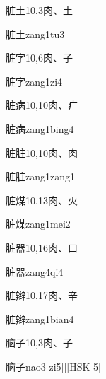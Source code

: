 \begin{entry}{脏土}{10,3}{⾁、⼟}
  \begin{phonetics}{脏土}{zang1tu3}
  \end{phonetics}
\end{entry}

\begin{entry}{脏字}{10,6}{⾁、⼦}
  \begin{phonetics}{脏字}{zang1zi4}
  \end{phonetics}
\end{entry}

\begin{entry}{脏病}{10,10}{⾁、⽧}
  \begin{phonetics}{脏病}{zang1bing4}
  \end{phonetics}
\end{entry}

\begin{entry}{脏脏}{10,10}{⾁、⾁}
  \begin{phonetics}{脏脏}{zang1zang1}
  \end{phonetics}
\end{entry}

\begin{entry}{脏煤}{10,13}{⾁、⽕}
  \begin{phonetics}{脏煤}{zang1mei2}
  \end{phonetics}
\end{entry}

\begin{entry}{脏器}{10,16}{⾁、⼝}
  \begin{phonetics}{脏器}{zang4qi4}
  \end{phonetics}
\end{entry}

\begin{entry}{脏辫}{10,17}{⾁、⾟}
  \begin{phonetics}{脏辫}{zang1bian4}
  \end{phonetics}
\end{entry}

\begin{entry}{脑子}{10,3}{⾁、⼦}
  \begin{phonetics}{脑子}{nao3 zi5}[][HSK 5]
  \end{phonetics}
\end{entry}

